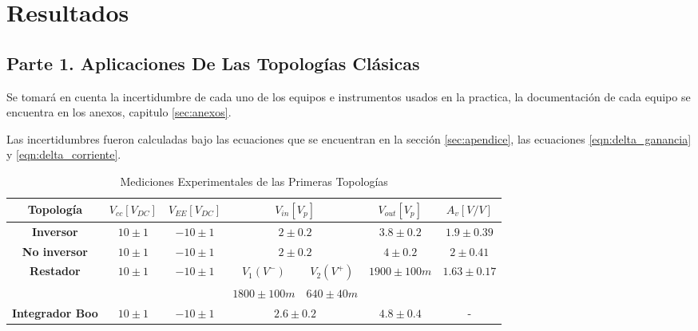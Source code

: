 
\section{Resultados}\label{sec:resultados}

\subsection{Parte 1. Aplicaciones De Las Topologías Clásicas}\label{subsec:parte1}

    Se tomará en cuenta la incertidumbre de cada uno de los equipos e instrumentos usados en la practica, la documentación de cada equipo se encuentra en los anexos, capitulo \ref{sec:anexos}.

    Las incertidumbres fueron calculadas bajo las ecuaciones que se encuentran en la sección \ref{sec:apendice}, las ecuaciones \ref{eqn:delta_ganancia} y \ref{eqn:delta_corriente}.


    \begin{table}[H]
      \centering
      \begin{tabular}{|c|c|c|cc|c|c|}
        \hline
        \textbf{Topología}                    & \textbf{$V_{cc} [V_{DC}]$}  & \textbf{$V_{EE} [V_{DC}]$}   & \multicolumn{2}{c|}{\textbf{$V_{in}[V_p]$}}                & \textbf{$V_{out} [V_p]$}          & \textbf{$A_v [V/V]$}             \\ \hline
        \textbf{Inversor}                     & $10 \pm 1$                  & $-10 \pm 1$                  & \multicolumn{2}{c|}{$2 \pm 0.2$}                           & $3.8 \pm 0.2$                     & $1.9 \pm 0.39$                   \\ \hline
        \textbf{No inversor}                  & $10 \pm 1$                  & $-10 \pm 1$                  & \multicolumn{2}{c|}{$2 \pm 0.2$}                           & $4\pm 0.2$                        & $2 \pm 0.41$                     \\ \hline
        \multirow{2}{*}{\textbf{Restador}}    & \multirow{2}{*}{$10 \pm 1$} & \multirow{2}{*}{$-10 \pm 1$} & \multicolumn{1}{c|}{$V_1 (V^-)$}        & $V_2 (V^+)$      & \multirow{2}{*}{$1900 \pm 100 m$} & \multirow{2}{*}{$1.63 \pm 0.17$} \\ \cline{4-5}
                                              &                             &                              & \multicolumn{1}{c|}{$ 1800 \pm 100 m $} & $ 640 \pm 40 m $ &                                   &                                  \\ \hline
        \textbf{Integrador Boo} & $10 \pm 1$                  & $-10 \pm 1$                  & \multicolumn{2}{c|}{$ 2.6 \pm 0.2 $}                       & $ 4.8 \pm 0.4 $                   & -                                \\ \hline
      \end{tabular}
      \caption{Mediciones Experimentales de las Primeras Topologías}
      \label{tab:resultados1}
  \end{table}

